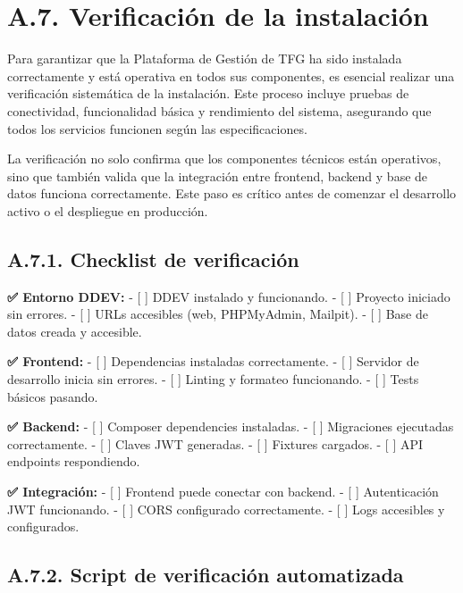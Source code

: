 \documentclass[12pt,a4paper,oneside]{report}
\begin{document}
\section{A.7. Verificación de la
instalación}\label{a.7.-verificaciuxf3n-de-la-instalaciuxf3n}

Para garantizar que la Plataforma de Gestión de TFG ha sido instalada correctamente y está operativa en todos sus componentes, es esencial realizar una verificación sistemática de la instalación. Este proceso incluye pruebas de conectividad, funcionalidad básica y rendimiento del sistema, asegurando que todos los servicios funcionen según las especificaciones.

La verificación no solo confirma que los componentes técnicos están operativos, sino que también valida que la integración entre frontend, backend y base de datos funciona correctamente. Este paso es crítico antes de comenzar el desarrollo activo o el despliegue en producción.

\subsection{A.7.1. Checklist de
verificación}\label{a.7.1.-checklist-de-verificaciuxf3n}

\textbf{✅ Entorno DDEV:} - {[} {]} DDEV instalado y funcionando. - {[}
{]} Proyecto iniciado sin errores. - {[} {]} URLs accesibles (web,
PHPMyAdmin, Mailpit). - {[} {]} Base de datos creada y accesible.

\textbf{✅ Frontend:} - {[} {]} Dependencias instaladas correctamente. -
{[} {]} Servidor de desarrollo inicia sin errores. - {[} {]} Linting y
formateo funcionando. - {[} {]} Tests básicos pasando.

\textbf{✅ Backend:} - {[} {]} Composer dependencies instaladas. - {[}
{]} Migraciones ejecutadas correctamente. - {[} {]} Claves JWT
generadas. - {[} {]} Fixtures cargados. - {[} {]} API endpoints
respondiendo.

\textbf{✅ Integración:} - {[} {]} Frontend puede conectar con backend.
- {[} {]} Autenticación JWT funcionando. - {[} {]} CORS configurado
correctamente. - {[} {]} Logs accesibles y configurados.

\subsection{A.7.2. Script de verificación
automatizada}\label{a.7.2.-script-de-verificaciuxf3n-automatizada}
\end{document}
